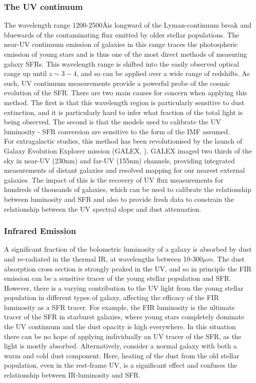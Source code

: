 \documentclass{literature}
\begin{document}
\subsubsection{The UV continuum}\label{subsubsec:uv_continuum}
The wavelength range 1200-2500\AA is longward of the Lyman-continuum break and bluewards of the contaminating flux emitted by older stellar populations. The near-UV continuum emission of galaxies in this range traces the photospheric emission of young stars and is thus one of the most direct methods of measuring galaxy SFRs. This wavelength range is shifted into the easily observed optical range up until $z\sim 3-4$, and so can be applied over a wide range of redshifts. As such, UV continuum measurements provide a powerful probe of the cosmic evolution of the SFR. There are two main causes for concern when applying this method. The first is that this wavelength region is particularly sensitive to dust extinction, and it is particularly hard to infer what fraction of the total light is being observed. The second is that the models used to calibrate the UV luminosity - SFR conversion are sensitive to the form of the IMF assumed. \\  

For extragalactic studies, this method has been revolutionised by the launch of Galaxy Evolution Explorer mission (GALEX, \citep{Martin2005}). GALEX imaged two thirds of the sky in near-UV (230nm) and far-UV (155nm) channels, providing integrated measurements of distant galaxies and resolved mapping for our nearest external galaxies. The impact of this is the recovery of UV flux measurements for hundreds of thousands of galaxies, which can be used to calibrate the relationship between luminosity and SFR and also to provide fresh data to constrain the relationship between the UV spectral slope and dust attenuation.      

\subsubsection{Infrared Emission}\label{subsubsec:ifrared}
A significant fraction of the bolometric luminosity of a galaxy is absorbed by dust and re-radiated in the thermal IR, at wavelengths between 10-300$\mu m$. The dust absorption cross section is strongly peaked in the UV, and so in principle the FIR emission can be a sensitive tracer of the young stellar population and SFR. However, there is a varying contribution to the UV light from the young stellar population in different types of galaxy, affecting the efficacy of the FIR luminosity as a SFR tracer. For example, the FIR luminosity is the ultimate tracer of the SFR in starburst galaxies, where young stars completely dominate the UV continuum and the dust opacity is high everywhere. In this situation there can be no hope of applying individually an UV tracer of the SFR, as the light is mostly absorbed. Alternatively, consider a normal galaxy with both a warm and cold dust component. Here, heating of the dust from the old stellar population, even in the rest-frame UV, is a significant effect and confuses the relationship between IR-luminosity and SFR. \\ 
\end{document}

